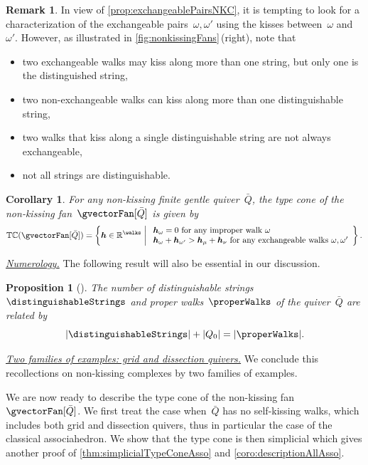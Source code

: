 \documentclass{amsart}
\newtheorem{corollary}[theorem]{Corollary}
\newtheorem{proposition}[theorem]{Proposition}
\theoremstyle{definition}
\newtheorem{remark}[theorem]{Remark}
\newcommand{\R}{\mathbb{R}} %
\renewcommand{\b}[1]{{\boldsymbol{#1}}} %
\newcommand{\set}[2]{\left\{ #1 \;\middle|\; #2 \right\}} %
\newcommand{\para}[1]{\medskip\noindent\uline{\textit{#1.}}} %
\newcommand{\vincent}[1]{\todo[color=blue!30]{#1 \\ \hfill --- V.}}
\newcommand{\typeCone}{\mathbb{TC}} %
\newcommand{\quiver}{\bar Q} %
\begin{document}
\begin{remark}
\label{rem:exchangeablePairsNKC}
In view of \cref{prop:exchangeablePairsNKC}, it is tempting to look for a characterization of the exchangeable pairs~$\omega, \omega'$ using the kisses between~$\omega$ and~$\omega'$.
However, as illustrated in \cref{fig:nonkissingFans}\,(right), note that
\begin{itemize}
\item two exchangeable walks may kiss along more than one string, but only one is the distinguished string,
\item two non-exchangeable walks can kiss along more than one distinguishable string,
\item two walks that kiss along a single distinguishable string are not always exchangeable,
\item not all strings are distinguishable.
\end{itemize}
\vincent{More explicit. TODO}
\end{remark}

\begin{corollary}
For any non-kissing finite gentle quiver~$\quiver$, the type cone of the non-kissing fan~$\gvectorFan[\quiver]$ is given by
\[
\typeCone(\gvectorFan[\quiver]) = \set{\b{h} \in \R^{\walks}}{\begin{array}{l} \b{h}_\omega = 0 \text{ for any improper walk } \omega \\ \b{h}_\omega + \b{h}_{\omega'} > \b{h}_\mu + \b{h}_\nu \text{ for any exchangeable walks } \omega, \omega' \end{array}}.
\]
\end{corollary}

\para{Numerology}
%
The following result will also be essential in our discussion.

\begin{proposition}[{\cite[3.68]{PaluPilaudPlamondon-nonkissing}}]
\label{prop:bijectionStringsWalks}
The number of distinguishable strings~$\distinguishableStrings$ and proper walks~$\properWalks$ of the quiver~$\quiver$ are related by
\[
|\distinguishableStrings| + |Q_0| = |\properWalks|.
\]
\end{proposition}

\para{Two families of examples: grid and dissection quivers}
%
We conclude this recollections on non-kissing complexes by two families of examples.
\vincent{TODO}

\bigskip
We are now ready to describe the type cone of the non-kissing fan~$\gvectorFan[\quiver]$.
We first treat the case when~$\quiver$ has no self-kissing walks, which includes both grid and dissection quivers, thus in particular the case of the classical associahedron.
We show that the type cone is then simplicial which gives another proof of \cref{thm:simplicialTypeConeAsso} and \cref{coro:descriptionAllAsso}.
\end{document}

